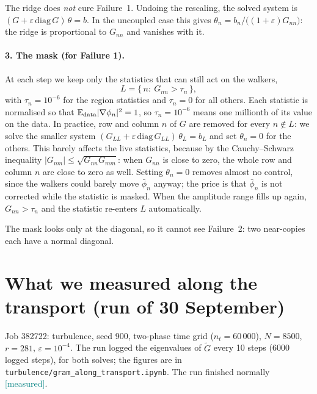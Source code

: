 \documentclass[11pt,a4paper]{article}
\newcommand{\code}[1]{\texttt{#1}}
\newcommand{\meas}{\textcolor{teal}{\textsf{[measured]}}}
\newcommand{\E}{\mathbb{E}}
\newcommand{\Gt}{\widetilde{G}}
\begin{document}
The ridge does \emph{not} cure Failure~1. Undoing the rescaling, the solved system is
$(G+\varepsilon\,\mathrm{diag}\,G)\,\theta=b$. In the uncoupled case this gives
$\theta_n=b_n/\big((1+\varepsilon)G_{nn}\big)$: the ridge is proportional to $G_{nn}$ and vanishes with it.

\paragraph{3. The mask (for Failure 1).} At each step we keep only the statistics that can still act on
the walkers,
\[
  L=\big\{\,n:\ G_{nn}>\tau_n\,\big\},
\]
with $\tau_n=10^{-6}$ for the region statistics and $\tau_n=0$ for all others. Each statistic is
normalised so that $\E_{\rm data}|\nabla\phi_n|^2=1$, so $\tau_n=10^{-6}$ means one millionth of its
value on the data. In practice, row and column $n$ of $G$ are removed for every $n\notin L$: we solve
the smaller system $(G_{LL}+\varepsilon\,\mathrm{diag}\,G_{LL})\,\theta_L=b_L$ and set $\theta_n=0$
for the others. This barely affects the live statistics, because by the Cauchy--Schwarz inequality
$|G_{nm}|\le\sqrt{G_{nn}G_{mm}}$: when $G_{nn}$ is close to zero, the whole row and column $n$ are
close to zero as well. Setting $\theta_n=0$ removes almost no control, since the walkers could barely
move $\bar\phi_n$ anyway; the price is that $\bar\phi_n$ is not corrected while the statistic is masked. When the amplitude range fills up again, $G_{nn}>\tau_n$ and the statistic
re-enters $L$ automatically.

The mask looks only at the diagonal, so it cannot see Failure~2: two near-copies each have a normal
diagonal.

\section{What we measured along the transport (run of 30 September)}\label{sec:measured}

Job 382722: turbulence, seed 900, two-phase time grid ($n_t=60\,000$), $N=8500$, $r=281$,
$\varepsilon=10^{-4}$. The run logged the eigenvalues of $\Gt$ every 10 steps (6000 logged steps),
for both solves; the figures are in \code{turbulence/gram\_along\_transport.ipynb}. The run
finished normally \meas.
\end{document}
